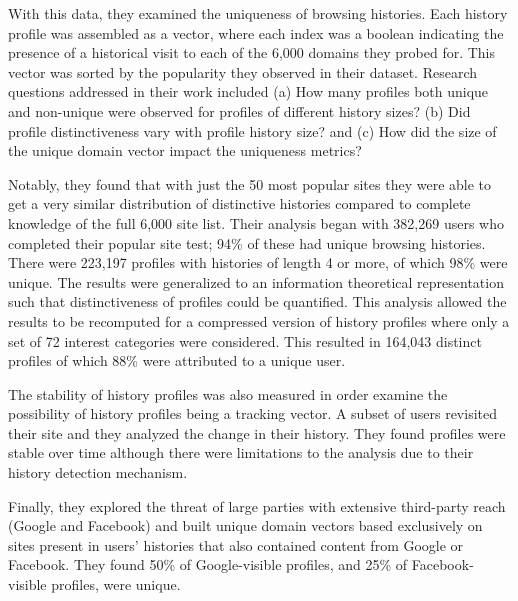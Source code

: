 \documentclass[letterpaper,twocolumn,10pt]{article}
\begin{document}
With this data, they examined the uniqueness of browsing histories. 
Each history profile was assembled as a vector, where each index was a boolean indicating the presence of a historical visit to each of the 6,000 domains they probed for. 
This vector was sorted by the popularity they observed in their dataset. 
Research questions addressed in their work included (a) How many profiles both unique and non-unique were observed for profiles of different history sizes? (b) Did profile distinctiveness vary with profile history size? and (c) How did the size of the unique domain vector impact the uniqueness metrics? 

Notably, they found that with just the 50 most popular sites they were able to get a very similar distribution of distinctive histories compared to complete knowledge of the full 6,000 site list.
Their analysis began with 382,269 users who completed their popular site test; 94\% of these had unique browsing histories. 
There were 223,197 profiles with histories of length 4 or more, of which 98\% were unique. 
The results were generalized to an information theoretical representation such that distinctiveness of profiles could be quantified. 
This analysis allowed the results to be recomputed for a compressed version of history profiles where only a set of 72 interest categories were considered. 
This resulted in 164,043 distinct profiles of which 88\% were attributed to a unique user. 

The stability of history profiles was also measured in order examine the possibility of history profiles being a tracking vector. 
A subset of users revisited their site and they analyzed the change in their history. 
They found profiles were stable over time although there were limitations to the analysis due to their history detection mechanism.

Finally, they explored the threat of large parties with extensive third-party reach (Google and Facebook) and built unique domain vectors based exclusively on sites present in users' histories that also contained content from Google or Facebook. 
They found 50\% of Google-visible profiles, and 25\% of Facebook-visible profiles, were unique.
%
\end{document}
